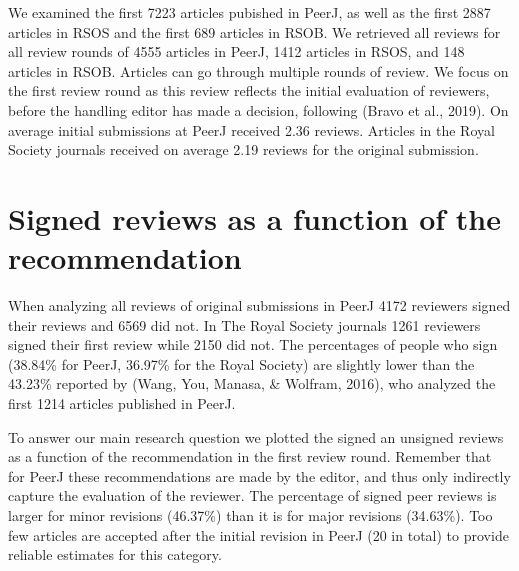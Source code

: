 \documentclass[,jou, a4paper,floatsintext]{apa6}
\begin{document}
We examined the first 7223 articles pubished in PeerJ, as well as the first 2887 articles in RSOS and the first 689 articles in RSOB. We retrieved all reviews for all review rounds of 4555 articles in PeerJ, 1412 articles in RSOS, and 148 articles in RSOB. Articles can go through multiple rounds of review. We focus on the first review round as this review reflects the initial evaluation of reviewers, before the handling editor has made a decision, following (Bravo et al., 2019). On average initial submissions at PeerJ received 2.36 reviews. Articles in the Royal Society journals received on average 2.19 reviews for the original submission.

\hypertarget{signed-reviews-as-a-function-of-the-recommendation}{%
\section{Signed reviews as a function of the recommendation}\label{signed-reviews-as-a-function-of-the-recommendation}}

When analyzing all reviews of original submissions in PeerJ 4172 reviewers signed their reviews and 6569 did not. In The Royal Society journals 1261 reviewers signed their first review while 2150 did not. The percentages of people who sign (38.84\% for PeerJ, 36.97\% for the Royal Society) are slightly lower than the 43.23\% reported by (Wang, You, Manasa, \& Wolfram, 2016), who analyzed the first 1214 articles published in PeerJ.

To answer our main research question we plotted the signed an unsigned reviews as a function of the recommendation in the first review round. Remember that for PeerJ these recommendations are made by the editor, and thus only indirectly capture the evaluation of the reviewer. The percentage of signed peer reviews is larger for minor revisions (46.37\%) than it is for major revisions (34.63\%). Too few articles are accepted after the initial revision in PeerJ (20 in total) to provide reliable estimates for this category.
\end{document}
